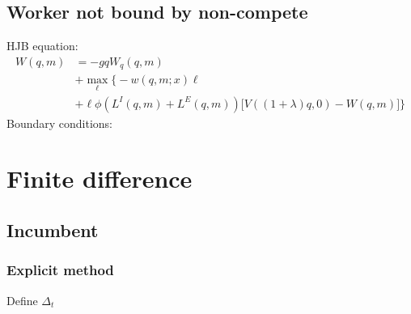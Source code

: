 \documentclass[12pt,english]{article}
\theoremstyle{remark}
\begin{document}
\subsection*{Worker not bound by non-compete}
HJB equation:
\begin{align*}
W(q,m) &= -gqW_q(q,m) \\
	   &+ \max_{\ell} \big\{-w(q,m;x)\ell \\
	   &+ \ell \phi (L^I(q,m) + L^E(q,m)) \big[ V((1+\lambda)q,0)-W(q,m) \big]\big\}
\end{align*}
Boundary conditions: 

\section*{Finite difference}

\subsection*{Incumbent}
\subsubsection*{Explicit method}

Define $\Delta_t$
\end{document}
